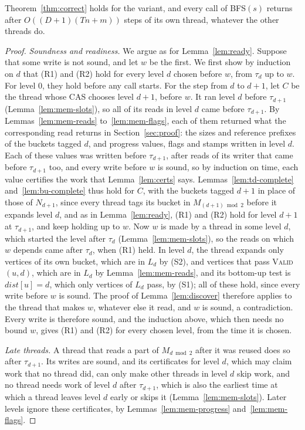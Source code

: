 \begin{theorem}
\label{thm:mem}
Theorem~\ref{thm:correct} holds for the variant, and every call of \textsc{BFS}$(s)$ returns after $O((D+1)(Tn + m))$ steps of its own thread, whatever the other threads do.
\end{theorem}
\begin{proof}
\emph{Soundness and readiness.} We argue as for Lemma~\ref{lem:ready}. Suppose that some write is not sound, and let $w$ be the first. We first show by induction on $d$ that (R1) and (R2) hold for every level $d$ chosen before $w$, from $\tau_d$ up to $w$. For level 0, they hold before any call starts. For the step from $d$ to $d+1$, let $C$ be the thread whose CAS chooses level $d+1$, before $w$. It ran level $d$ before $\tau_{d+1}$ (Lemma~\ref{lem:mem-slots}), so all of its reads in level $d$ came before $\tau_{d+1}$. By Lemmas~\ref{lem:mem-reads} to~\ref{lem:mem-flags}, each of them returned what the corresponding read returns in Section~\ref{sec:proof}: the sizes and reference prefixes of the buckets tagged $d$, and progress values, flags and stamps written in level $d$. Each of these values was written before $\tau_{d+1}$, after reads of its writer that came before $\tau_{d+1}$ too, and every write before $w$ is sound, so by induction on time, each value certifies the work that Lemma~\ref{lem:certs} says. Lemmas~\ref{lem:td-complete} and~\ref{lem:bu-complete} thus hold for $C$, with the buckets tagged $d+1$ in place of those of $N_{d+1}$, since every thread tags its bucket in $M_{(d+1) \bmod 2}$ before it expands level $d$, and as in Lemma~\ref{lem:ready}, (R1) and (R2) hold for level $d+1$ at $\tau_{d+1}$, and keep holding up to $w$. Now $w$ is made by a thread in some level $d$, which started the level after $\tau_d$ (Lemma~\ref{lem:mem-slots}), so the reads on which $w$ depends came after $\tau_d$, when (R1) held. In level $d$, the thread expands only vertices of its own bucket, which are in $L_d$ by (S2), and vertices that pass \textsc{Valid}$(u, d)$, which are in $L_d$ by Lemma~\ref{lem:mem-reads}, and its bottom-up test is $\mathit{dist}[u] = d$, which only vertices of $L_d$ pass, by (S1); all of these hold, since every write before $w$ is sound. The proof of Lemma~\ref{lem:discover} therefore applies to the thread that makes $w$, whatever else it read, and $w$ is sound, a contradiction. Every write is therefore sound, and the induction above, which then needs no bound $w$, gives (R1) and (R2) for every chosen level, from the time it is chosen.

\emph{Late threads.} A thread that reads a part of $M_{d \bmod 2}$ after it was reused does so after $\tau_{d+1}$. Its writes are sound, and its certificates for level $d$, which may claim work that no thread did, can only make other threads in level $d$ skip work, and no thread needs work of level $d$ after $\tau_{d+1}$, which is also the earliest time at which a thread leaves level $d$ early or skips it (Lemma~\ref{lem:mem-slots}). Later levels ignore these certificates, by Lemmas~\ref{lem:mem-progress} and~\ref{lem:mem-flags}.


\end{proof}
